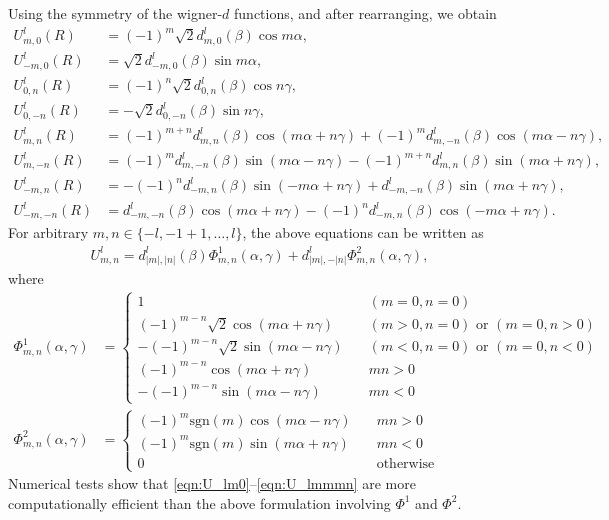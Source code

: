 \documentclass[onecolumn,11pt]{IEEEtran}
\begin{document}
Using the symmetry of the wigner-$d$ functions, and after rearranging, we obtain 
\begin{align}
    U^l_{m,0} (R) &= (-1)^m \sqrt{2} d^l_{m,0}(\beta) \cos m\alpha,\label{eqn:U_lm0} \\
    U^l_{-m,0} (R) &= \sqrt{2} d^l_{-m,0}(\beta) \sin m\alpha,\\
    U^l_{0,n} (R) &= (-1)^{n} \sqrt{2} d^l_{0,n}(\beta) \cos n\gamma, \\ 
    U^l_{0,-n} (R) &= -\sqrt{2} d^l_{0,-n}(\beta) \sin n\gamma,\\
    U^l_{m,n} (R) &= (-1)^{m+n} d^l_{m,n}(\beta) \cos (m\alpha + n\gamma) + (-1)^m d^l_{m,-n}(\beta) \cos(m\alpha - n\gamma),\\
    U^l_{m,-n} (R) & = (-1)^{m} d^l_{m,-n}(\beta) \sin(m\alpha-n\gamma) - (-1)^{m+n} d^l_{m,n}(\beta)\sin(m\alpha+n\gamma),\\
    U^l_{-m,n} (R) & = -(-1)^n d^l_{-m,n}(\beta) \sin(-m\alpha+n\gamma) + d^l_{-m,-n}(\beta) \sin(m\alpha+n\gamma),\\
    U^l_{-m,-n} (R) & = d^l_{-m,-n}(\beta) \cos (m\alpha + n\gamma) - (-1)^n d^l_{-m,n}(\beta) \cos(-m\alpha + n\gamma).\label{eqn:U_lmmmn}
\end{align} 
For arbitrary $m,n\in\{-l,-1+1,\ldots,l\}$, the above equations can be written as 
\begin{align*}
    U^l_{m,n} =  d^l_{|m|,|n|}(\beta) \Phi^1_{m,n}(\alpha,\gamma) + d^l_{|m|,-|n|} \Phi^2_{m,n}(\alpha,\gamma),
\end{align*}
where
\begin{align*}
    \Phi^1_{m,n}(\alpha,\gamma) 
    & =\begin{cases}
    1 \quad &(m=0,n=0)\\
    (-1)^{m-n}\sqrt{2} \cos(m\alpha+n\gamma) \quad & (m>0,n=0) \text{ or } (m=0,n>0)\\
    -(-1)^{m-n}\sqrt{2} \sin(m\alpha-n\gamma) \quad & (m<0,n=0) \text{ or } (m=0,n<0)\\
    (-1)^{m-n} \cos(m\alpha+n\gamma) \quad & mn >0 \\
    -(-1)^{m-n} \sin(m\alpha-n\gamma) \quad & mn < 0 
\end{cases}\\
\Phi^2_{m,n}(\alpha,\gamma) 
    & =\begin{cases}
(-1)^{m}\mathrm{sgn}(m) \cos(m\alpha-n\gamma) \quad & mn >0 \\
(-1)^{m}\mathrm{sgn}(m) \sin(m\alpha+n\gamma) \quad & mn <0\\
0 & \text{otherwise}
    \end{cases}
\end{align*}
Numerical tests show that \eqref{eqn:U_lm0}--\eqref{eqn:U_lmmmn} are more computationally efficient than the above formulation involving $\Phi^1$ and $\Phi^2$. 
\end{document}
